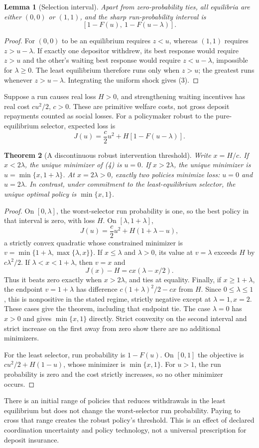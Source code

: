 \documentclass[11pt,a4paper]{article}
\newtheorem{theorem}{Theorem}[section]
\newtheorem{lemma}[theorem]{Lemma}
\theoremstyle{remark}
\begin{document}
\begin{lemma}[Selection interval]
Apart from zero-probability ties, all equilibria are either $(0,0)$ or $(1,1)$, and the sharp run-probability interval is
\[
 [1-F(u),\ 1-F(u-\lambda)]. \tag{3}
\]
\end{lemma}
\begin{proof}
For $(0,0)$ to be an equilibrium requires $z<u$, whereas $(1,1)$ requires $z>u-\lambda$. If exactly one depositor withdrew, its best response would require $z>u$ and the other's waiting best response would require $z<u-\lambda$, impossible for $\lambda\ge0$. The least equilibrium therefore runs only when $z>u$; the greatest runs whenever $z>u-\lambda$. Integrating the uniform shock gives (3).
\end{proof}
Suppose a run causes real loss $H>0$, and strengthening waiting incentives has real cost $cu^2/2$, $c>0$. These are primitive welfare costs, not gross deposit repayments counted as social losses. For a policymaker robust to the pure-equilibrium selector, expected loss is
\[
 J(u)=\frac c2u^2+H[1-F(u-\lambda)]. \tag{4}
\]

\begin{theorem}[A discontinuous robust intervention threshold]
Write $x=H/c$. If $x<2\lambda$, the unique minimizer of (4) is $u=0$. If $x>2\lambda$, the unique minimizer is $u=\min\{x,1+\lambda\}$. At $x=2\lambda>0$, exactly two policies minimize loss: $u=0$ and $u=2\lambda$. In contrast, under commitment to the least-equilibrium selector, the unique optimal policy is $\min\{x,1\}$.
\end{theorem}
\begin{proof}
On $[0,\lambda]$, the worst-selector run probability is one, so the best policy in that interval is zero, with loss $H$. On $[\lambda,1+\lambda]$,
\[
 J(u)=\frac c2u^2+H(1+\lambda-u),
\]
a strictly convex quadratic whose constrained minimizer is $v=\min\{1+\lambda,\max\{\lambda,x\}\}$.
If $x\le\lambda$ and $\lambda>0$, its value at $v=\lambda$ exceeds $H$ by $c\lambda^2/2$. If $\lambda<x<1+\lambda$, then $v=x$ and
\[
 J(x)-H=cx(\lambda-x/2).
\]
Thus it beats zero exactly when $x>2\lambda$, and ties at equality. Finally, if $x\ge1+\lambda$, the endpoint $v=1+\lambda$ has difference
$c(1+\lambda)^2/2-cx$ from $H$. Since $0\le\lambda\le1$, this is nonpositive in the stated regime, strictly negative except at $\lambda=1,x=2$. These cases give the theorem, including that endpoint tie. The case $\lambda=0$ has $x>0$ and gives $\min\{x,1\}$ directly. Strict convexity on the second interval and strict increase on the first away from zero show there are no additional minimizers.

For the least selector, run probability is $1-F(u)$. On $[0,1]$ the objective is $cu^2/2+H(1-u)$, whose minimizer is $\min\{x,1\}$. For $u>1$, the run probability is zero and the cost strictly increases, so no other minimizer occurs.
\end{proof}
There is an initial range of policies that reduces withdrawals in the least equilibrium but does not change the worst-selector run probability. Paying to cross that range creates the robust policy's threshold. This is an effect of declared coordination uncertainty and policy technology, not a universal prescription for deposit insurance.
\end{document}
